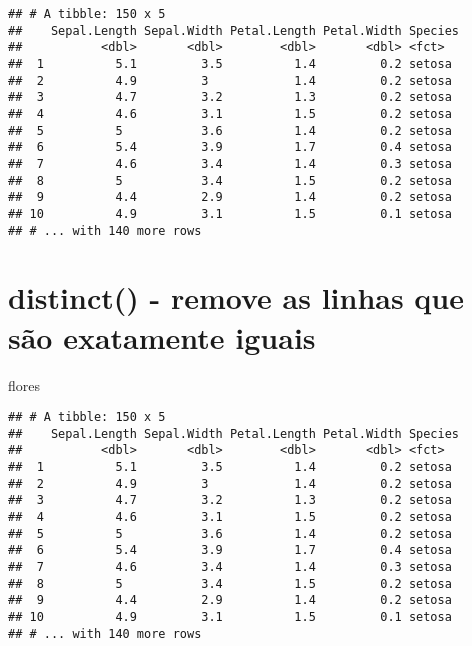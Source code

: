 \documentclass[]{book}
\newenvironment{Shaded}{\begin{snugshade}}{\end{snugshade}}
\newcommand{\NormalTok}[1]{#1}
\begin{document}
\begin{verbatim}
## # A tibble: 150 x 5
##    Sepal.Length Sepal.Width Petal.Length Petal.Width Species
##           <dbl>       <dbl>        <dbl>       <dbl> <fct>  
##  1          5.1         3.5          1.4         0.2 setosa 
##  2          4.9         3            1.4         0.2 setosa 
##  3          4.7         3.2          1.3         0.2 setosa 
##  4          4.6         3.1          1.5         0.2 setosa 
##  5          5           3.6          1.4         0.2 setosa 
##  6          5.4         3.9          1.7         0.4 setosa 
##  7          4.6         3.4          1.4         0.3 setosa 
##  8          5           3.4          1.5         0.2 setosa 
##  9          4.4         2.9          1.4         0.2 setosa 
## 10          4.9         3.1          1.5         0.1 setosa 
## # ... with 140 more rows
\end{verbatim}

\hypertarget{distinct---remove-as-linhas-que-suxe3o-exatamente-iguais}{%
\section{distinct() - remove as linhas que são exatamente iguais}\label{distinct---remove-as-linhas-que-suxe3o-exatamente-iguais}}

\begin{Shaded}
\begin{Highlighting}[]
\NormalTok{flores}
\end{Highlighting}
\end{Shaded}

\begin{verbatim}
## # A tibble: 150 x 5
##    Sepal.Length Sepal.Width Petal.Length Petal.Width Species
##           <dbl>       <dbl>        <dbl>       <dbl> <fct>  
##  1          5.1         3.5          1.4         0.2 setosa 
##  2          4.9         3            1.4         0.2 setosa 
##  3          4.7         3.2          1.3         0.2 setosa 
##  4          4.6         3.1          1.5         0.2 setosa 
##  5          5           3.6          1.4         0.2 setosa 
##  6          5.4         3.9          1.7         0.4 setosa 
##  7          4.6         3.4          1.4         0.3 setosa 
##  8          5           3.4          1.5         0.2 setosa 
##  9          4.4         2.9          1.4         0.2 setosa 
## 10          4.9         3.1          1.5         0.1 setosa 
## # ... with 140 more rows
\end{verbatim}
\end{document}
